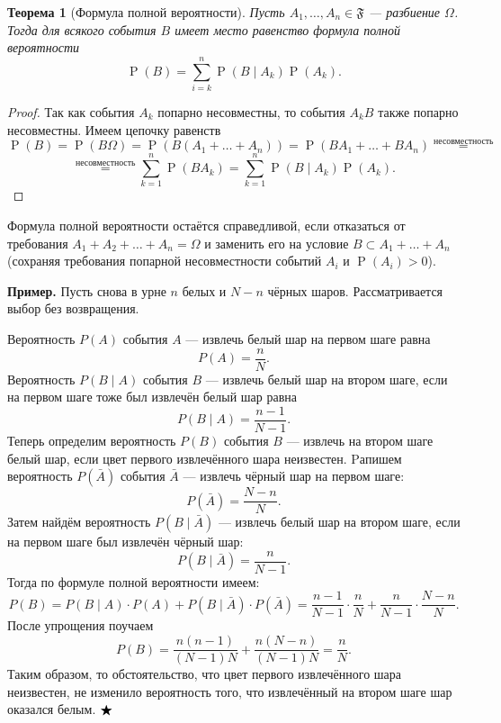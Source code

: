 \documentclass[12pt]{article}
\newtheorem{theorem}{Теорема}
\numberwithin{theorem}{section}
\theoremstyle{definition}
\newenvironment{example}{\indent \textbf{Пример.}}{$ \hfill \bigstar $}
\newcommand{\prob}{\operatorname{P}}
\newcommand{\events}{\mathfrak{F}}
\begin{document}
	\begin{theorem}[Формула полной вероятности] \label{law of total probability}
		Пусть $ A_1, \ldots, A_n \in \events $ --- разбиение $ \Omega $. 
		Тогда для всякого события $ B $ имеет место равенство формула полной вероятности
		$$ \prob(B) = \sum\limits_{i = k}^{n} \prob(B \mid A_k)\prob(A_k). $$
	\end{theorem}
	
	\begin{proof}
		Так как события $ A_k $ попарно несовместны, то события $ A_kB $ также попарно несовместны.
		Имеем цепочку равенств
		$$ \prob(B) = \prob(B\Omega) = \prob(B(A_1 + \ldots + A_n))
		= \prob(BA_1 + \ldots + BA_n) \overset{\text{несовместность}}{=} $$ 
	    $$ \overset{\text{несовместность}}{=} \sum\limits_{k = 1}^{n} \prob(BA_k)
		= \sum\limits_{k = 1}^{n} \prob(B\mid A_k)\prob(A_k). $$
	\end{proof}
	
	Формула полной вероятности остаётся справедливой, если отказаться от требования $ A_1 + A_2 + \ldots + A_n = \Omega $
	и заменить его на условие $ B \subset A_1 + \ldots + A_n $ (сохраняя требования попарной несовместности событий $ A_i $ 
	и $ \prob(A_i) > 0 $).
	
	\begin{example}
		Пусть снова в урне $n$ белых и $N - n$ чёрных шаров.  
		Рассматривается выбор без возвращения.
		
		Вероятность $P(A)$ события $A$ — извлечь белый шар на первом шаге
		равна
		\[
		P(A) = \frac{n}{N}.
		\]
		Вероятность $P(B \mid A)$ события $B$ — извлечь белый шар на втором шаге, если на первом шаге тоже был извлечён белый шар  
		равна
		\[
		P(B \mid A) = \frac{n - 1}{N - 1}.
		\]
		Теперь определим вероятность $P(B)$ события $B$ — извлечь на втором шаге белый шар, если цвет первого извлечённого шара неизвестен.  
		Pапишем вероятность $P(\bar{A})$ события $\bar{A}$ — извлечь чёрный шар на первом шаге:
		\[
		P(\bar{A}) = \frac{N - n}{N}.
		\]
		Затем найдём вероятность $P(B \mid \bar{A})$ — извлечь белый шар на втором шаге, если на первом шаге был извлечён чёрный шар:
		\[
		P(B \mid \bar{A}) = \frac{n}{N - 1}.
		\]
		Тогда по формуле полной вероятности имеем:
		\[
		P(B) = P(B \mid A) \cdot P(A) + P(B \mid \bar{A}) \cdot P(\bar{A}) = 
		\frac{n - 1}{N - 1} \cdot \frac{n}{N} + \frac{n}{N - 1} \cdot \frac{N - n}{N}.
		\]
		После упрощения поучаем
		\[
		P(B) = \frac{n(n - 1)}{(N - 1)N} + \frac{n(N - n)}{(N - 1)N} = \frac{n}{N}.
		\]
		Таким образом, то обстоятельство, что цвет первого извлечённого шара неизвестен, не изменило вероятность того, что извлечённый на втором шаге шар оказался белым.
	\end{example}
	
\end{document}
